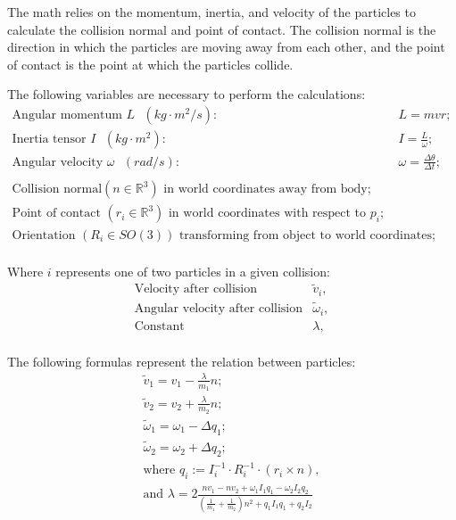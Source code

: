 \documentclass[a4paper,12pt,titlepage]{article}
\begin{document}
The math relies on the momentum, inertia, and velocity of the particles to
calculate the collision normal and point of contact. The collision normal is
the direction in which the particles are moving away from each other, and the
point of contact is the point at which the particles collide.

The following variables are necessary to perform the calculations:
\[
\begin{array}{ll}
	\text{Angular momentum $L$ } (kg\cdot m^2/s): & L = mvr; \\
	\text{Inertia tensor $I$ } (kg\cdot m^2): & I = \frac{L}{\omega}; \\
    \text{Angular velocity $\omega$ } (rad/s): & \omega = \frac{\Delta \theta}{\Delta t}; \\

	\\

	\text{Collision normal} (n \in \mathbb{R}^3) \text{ in world coordinates away from body}; \\
	\text{Point of contact } (r_i \in \mathbb{R}^3) \text{ in world coordinates with respect to $p_i$}; \\
	\text{Orientation } (R_i \in SO(3)) \text{ transforming from object to world coordinates}; \\
\end{array}
\]

Where $i$ represents one of two particles in a given collision:
\[
\begin{array}{ll}
	\text{Velocity after collision} & \tilde{v}_i, \\ 
	\text{Angular velocity after collision} & \tilde{\omega}_i, \\
	\text{Constant} & \lambda, \\
\end{array}
\]

The following formulas represent the relation between particles:
\[
\begin{array}{cc}
	\tilde{v}_1 = v_1 - \frac{\lambda}{m_1} n; \\ 
	\tilde{v}_2 = v_2 + \frac{\lambda}{m_2} n; \\
	\tilde{\omega}_1 = \omega_1 - \Delta q_1; \\
	\tilde{\omega}_2 = \omega_2 + \Delta q_2; \\

	\text{where } q_i := I_i^{-1} \cdot R_i^{-1} \cdot (r_i\times n), \\
	\text{and } \lambda = 2 \frac{n v_1 - n v_2 + \omega_1 I_1 q_1 - \omega_2 I_2 q_2}
	{(\frac{1}{m_1} + \frac{1}{m_2})n^2 + q_1 I_1 q_1 + q_2 I_2} \\
\end{array}
\]
\end{document}
